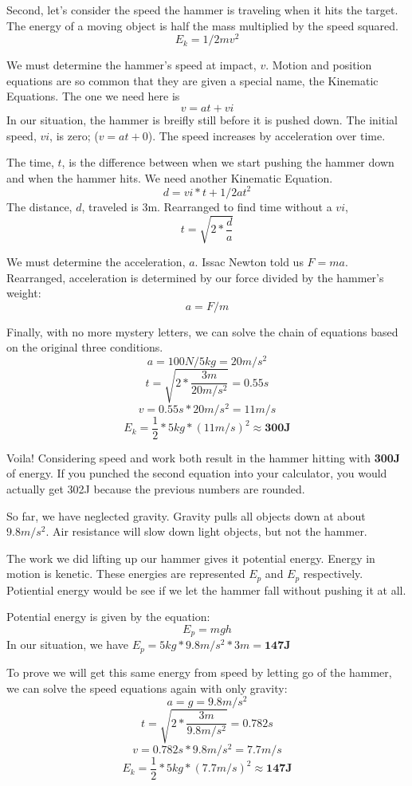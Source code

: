 \documentclass[11pt,a4paper]{article}
\begin{document}
Second, let's consider the speed the hammer is traveling when it hits the target. The energy of a moving object is half the mass multiplied by the speed squared. $$E_k= 1/2mv^2$$

We must determine the hammer's speed at impact, $v$.
Motion and position equations are so common that they are given a special name, the Kinematic Equations. The one we need here is
$$v=at+vi$$
In our situation, the hammer is breifly still before it is pushed down. The initial speed, $vi$, is zero; ($v = at + 0$).
The speed increases by acceleration over time.

The time, $t$, is the difference between when we start pushing the hammer down and when the hammer hits.
We need another Kinematic Equation.
$$d = vi*t + 1/2at^2$$
The distance, $d$, traveled is 3m. Rearranged to find time without a $vi$,
$$t = \sqrt{2*\frac{d}{a}}$$

We must determine the acceleration, $a$. Issac Newton told us $F=ma$. Rearranged, acceleration is determined by our force divided by the hammer's weight:
$$a=F/m$$
\pagebreak

Finally, with no more mystery letters, we can solve the chain of equations based on the original three conditions.
$$a = 100N/5kg = 20m/s^2$$
$$t=\sqrt{2*\frac{3m}{20m/s^2}}= 0.55s$$
$$v = 0.55s * 20m/s^2= 11m/s$$
$$E_k=\frac{1}{2}*5kg*(11m/s)^2\approx\mathbf{300J}$$

Voila! Considering speed and work both result in the hammer hitting with \textbf{300J} of energy.
If you punched the second equation into your calculator, you would actually get 302J because the previous numbers are rounded.
\pagebreak

So far, we have neglected gravity. Gravity pulls all objects down at about $9.8m/s^2$.
Air resistance will slow down light objects, but not the hammer.

The work we did lifting up our hammer gives it potential energy.
Energy in motion is kenetic. These energies are represented $E_p$ and $E_p$ respectively.
Potiential energy would be see if we let the hammer fall without pushing it at all.

Potential energy is given by the equation: $$E_p=mgh$$
In our situation, we have $E_p=5kg*9.8m/s^2*3m=\mathbf{147J}$

To prove we will get this same energy from speed by letting go of the hammer, we can solve the speed equations again with only gravity:
$$a=g=9.8m/s^2$$
$$t=\sqrt{2*\frac{3m}{9.8m/s^2}}= 0.782s$$
$$v = 0.782s * 9.8m/s^2= 7.7m/s$$
$$E_k=\frac{1}{2}*5kg*(7.7m/s)^2\approx\mathbf{147J}$$
\end{document}
